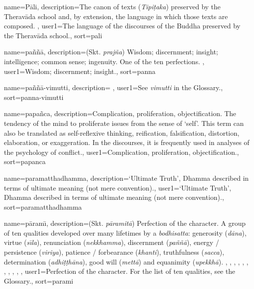 {
name={P\=ali},
description={The canon of texts (\textit{Tipi\d{t}aka}) preserved by the Therav\=ada school and, by extension, the language in which those texts are composed. \protect \seepre %
\protect {}%
\protect \seepost %
},
user1={The language of the discourses of the Buddha preserved by the Therav\=ada school.},
sort={pali}
}

{
name={pa\~n\~n\=a},
description={(Skt. \textit{praj\~na}) Wisdom; discernment; insight; intelligence; common sense; ingenuity. One of the ten perfections. \protect \seepre %
\protect {}%
\protect \seepost %
},
user1={Wisdom; discernment; insight.},
sort={panna}
}

{
name={pa\~n\~n\=a-vimutti},
description={\nopostdesc \protect \seepre %
\protect {}%
\protect \seepost %
},
user1={See \textit{vimutti} in the Glossary.},
sort={panna-vimutti}
}

{
name={papa\~nca},
description={Complication, proliferation, objectification. The tendency of the mind to proliferate issues from the sense of `self'. This term can also be translated as self-reflexive thinking, reification, falsification, distortion, elaboration, or exaggeration. In the discourses, it is frequently used in analyses of the psychology of conflict.},
user1={Complication, proliferation, objectification.},
sort={papanca}
}

{
name=paramatthadhamma,
description={`Ultimate Truth', Dhamma described in terms of ultimate meaning (not mere convention).},
user1={`Ultimate Truth', Dhamma described in terms of ultimate meaning (not mere convention).},
sort={paramatthadhamma}
}

{
name={p\=aram\={\i}},
description={(Skt. \textit{p\=aramit\=a}) Perfection of the character. A group of ten qualities developed over many lifetimes by a \textit{bodhisatta}: generosity (\textit{d\=ana}), virtue (\textit{s\={\i}la}), renunciation (\textit{nekkhamma}), discernment (\textit{pa\~n\~n\=a}), energy / persistence (\textit{viriya}), patience / forbearance (\textit{khanti}), truthfulness (\textit{sacca}), determination (\textit{adhi\d{t}\d{t}h\=ana}), good will (\textit{mett\=a}) and equanimity (\textit{upekkh\=a}). \protect \seepre %
\protect {}, \protect {}, \protect {}, \protect {}, \protect {}, \protect {}, \protect {}, \protect {}, \protect {}, \protect {}, \protect {}%
\protect \seepost %
},
user1={Perfection of the character. For the list of ten qualities, see the Glossary.},
sort={parami}
}

